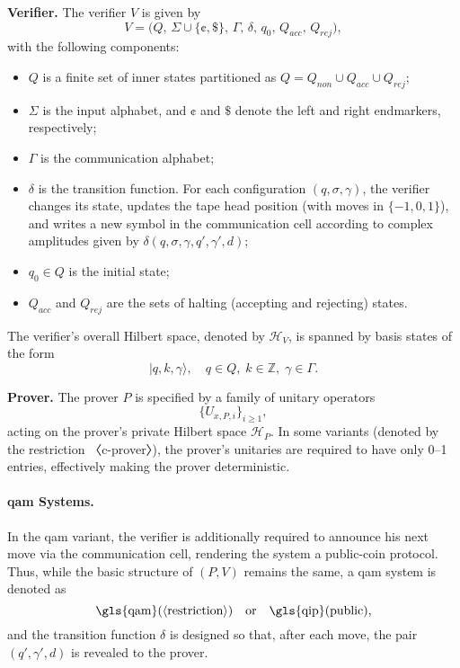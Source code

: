 \textbf{Verifier.} The verifier $V$ is given by
\[
V = \bigl(Q,\, \Sigma \cup \{\cent,\$\},\, \Gamma,\, \delta,\, q_0,\, Q_{acc},\, Q_{rej}\bigr),
\]
with the following components:
\begin{itemize}
  \item $Q$ is a finite set of inner states partitioned as $Q = Q_{non} \cup Q_{acc} \cup Q_{rej}$;
  \item $\Sigma$ is the input alphabet, and $\cent$ and $\$$ denote the left and right endmarkers, respectively;
  \item $\Gamma$ is the communication alphabet;
  \item $\delta$ is the transition function. For each configuration $(q,\sigma,\gamma)$, the verifier changes its state, updates the tape head position (with moves in $\{-1,0,1\}$), and writes a new symbol in the communication cell according to complex amplitudes given by $\delta(q,\sigma,\gamma,q',\gamma',d)$;
  \item $q_0\in Q$ is the initial state;
  \item $Q_{acc}$ and $Q_{rej}$ are the sets of halting (accepting and rejecting) states.
\end{itemize}
The verifier’s overall Hilbert space, denoted by $\mathit{\mathcal{H}}_V$, is spanned by basis states of the form
\[
|q, k, \gamma\rangle,\quad q\in Q,\; k\in \mathbb{Z},\; \gamma\in\Gamma.
\]

\textbf{Prover.} The prover $P$ is specified by a family of unitary operators
\[
\{U_{x,P,i}\}_{i\ge1},
\]
acting on the prover’s private Hilbert space $\mathit{\mathcal{H}}_P$. In some variants (denoted by the restriction 〈c-prover〉), the prover’s unitaries are required to have only 0–1 entries, effectively making the prover deterministic.

\paragraph{\gls{qam} Systems.} In the \gls{qam} variant, the verifier is additionally required to announce his next move via the communication cell, rendering the system a public-coin protocol. Thus, while the basic structure of $(P,V)$ remains the same, a \gls{qam} system is denoted as
\[
\text{\gls{qam}}(\langle\text{restriction}\rangle) \quad \text{or} \quad \text{\gls{qip}}(\text{public}),
\]
and the transition function $\delta$ is designed so that, after each move, the pair $(q',\gamma',d)$ is revealed to the prover.

